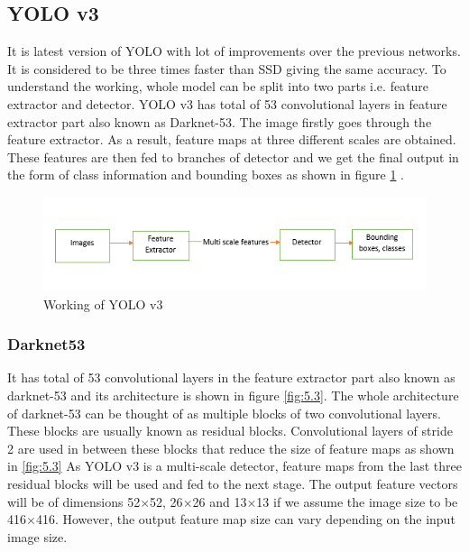   \subsection{YOLO v3}
  It is latest version of YOLO with lot of improvements over the previous networks. It is considered to be three times faster than SSD giving the same accuracy. To understand the working, whole model can be split into two parts i.e. feature extractor and detector. YOLO v3 has total of 53 convolutional layers in feature extractor part also known as Darknet-53. The image firstly goes through the feature extractor. As a result, feature maps at three different scales are obtained. These features are then fed to branches of detector and we get the final output in the form of class information and bounding boxes as shown in figure \ref{fig:5.2} \cite{chap_5_article:3}.
  \begin{figure}[H]
    \centering
    \captionsetup{justification = centering}
    \includegraphics[scale= 1]{CHAPTERS/Chapter-5/images/5.2.png}
    \caption{Working of YOLO v3 } 
    \label{fig:5.2}
  \end{figure}
  \subsubsection{Darknet53}
    It has total of 53 convolutional layers in the feature extractor part also known as darknet-53 and its architecture is shown in figure \ref{fig:5.3}. The whole architecture of darknet-53 can be thought of as multiple blocks of two convolutional layers. These blocks are usually known as residual blocks. Convolutional layers of stride 2 are used in between these blocks that reduce the size of feature maps as shown in \ref{fig:5.3} As YOLO v3 is a multi-scale detector, feature maps from the last three residual blocks will be used and fed to the next stage. The output feature vectors will be of dimensions 52$\times$52, 26$\times$26 and 13$\times$13 if we assume the image size to be 416$\times$416. However, the output feature map size can vary depending on the input image size.

